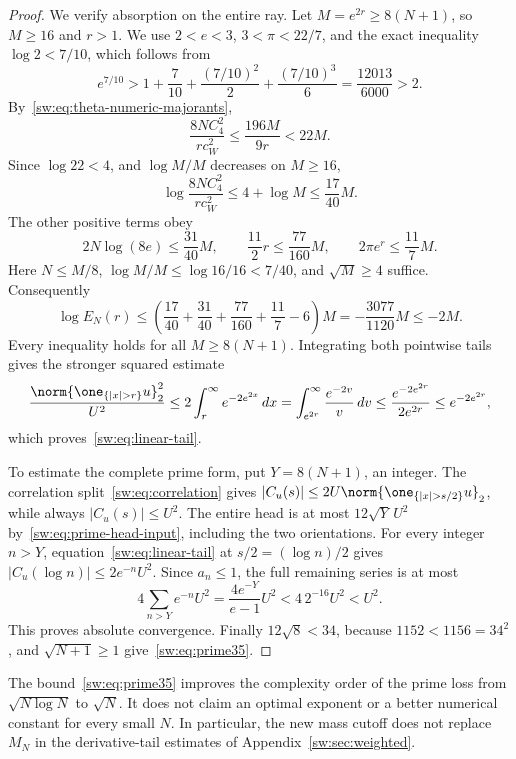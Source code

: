 \documentclass[11pt,a4paper]{article}
\numberwithin{equation}{section}
\theoremstyle{definition}\newtheorem{definition}[theorem]{Definition}
\theoremstyle{remark}\newtheorem{remark}[theorem]{Remark}
\begin{document}
\begin{proof}
We verify absorption on the entire ray. Let $M=e^{2r}\ge8(N+1)$, so $M\ge16$ and $r>1$. We use $2<e<3$, $3<\pi<22/7$, and the exact inequality $\log2<7/10$, which follows from
\[
 e^{7/10}>1+\frac7{10}+\frac{(7/10)^2}{2}+\frac{(7/10)^3}{6}
 =\frac{12013}{6000}>2.
\]
By~\eqref{sw:eq:theta-numeric-majorants},
\[
 \frac{8NC_4^2}{rc_W^2}\le\frac{196M}{9r}<22M.
\]
Since $\log22<4$, and $\log M/M$ decreases on $M\ge16$,
\[
 \log\frac{8NC_4^2}{rc_W^2}\le4+\log M\le\frac{17}{40}M.
\]
The other positive terms obey
\[
 2N\log(8e)\le\frac{31}{40}M,\qquad
 \frac{11}2r\le\frac{77}{160}M,\qquad
 2\pi e^r\le\frac{11}{7}M.
\]
Here $N\le M/8$, $\log M/M\le\log16/16<7/40$, and $\sqrt M\ge4$ suffice. Consequently
\begin{equation}\label{sw:eq:sharp-absorb}
 \log E_N(r)\le
 \left(\frac{17}{40}+\frac{31}{40}+\frac{77}{160}+\frac{11}{7}-6\right)M
 =-\frac{3077}{1120}M\le-2M.
\end{equation}
Every inequality holds for all $M\ge8(N+1)$. Integrating both pointwise tails gives the stronger squared estimate
\begin{equation}\label{sw:eq:sharp-integrated}
 \frac{\norm{\one_{\{|x|>r\}}u}_2^2}{U^2}
 \le2\int_r^\infty e^{-2e^{2x}}\,dx
 =\int_{e^{2r}}^\infty\frac{e^{-2v}}v\,dv
 \le\frac{e^{-2e^{2r}}}{2e^{2r}}\le e^{-2e^{2r}},
\end{equation}
which proves~\eqref{sw:eq:linear-tail}.

To estimate the complete prime form, put $Y=8(N+1)$, an integer. The correlation split~\eqref{sw:eq:correlation} gives
$|C_u(s)|\le2U\norm{\one_{\{|x|>s/2\}}u}_2$, while always $|C_u(s)|\le U^2$. The entire head is at most $12\sqrt Y\,U^2$ by~\eqref{sw:eq:prime-head-input}, including the two orientations. For every integer $n>Y$, equation~\eqref{sw:eq:linear-tail} at $s/2=(\log n)/2$ gives $|C_u(\log n)|\le2e^{-n}U^2$. Since $a_n\le1$, the full remaining series is at most
\[
 4\sum_{n>Y}e^{-n}U^2=\frac{4e^{-Y}}{e-1}U^2
 <4\,2^{-16}U^2<U^2.
\]
This proves absolute convergence. Finally $12\sqrt8<34$, because $1152<1156=34^2$, and $\sqrt{N+1}\ge1$ give~\eqref{sw:eq:prime35}.
\end{proof}

The bound~\eqref{sw:eq:prime35} improves the complexity order of the prime loss from $\sqrt{N\log N}$ to $\sqrt N$. It does not claim an optimal exponent or a better numerical constant for every small $N$. In particular, the new mass cutoff does not replace $M_N$ in the derivative-tail estimates of Appendix~\ref{sw:sec:weighted}.
\end{document}
